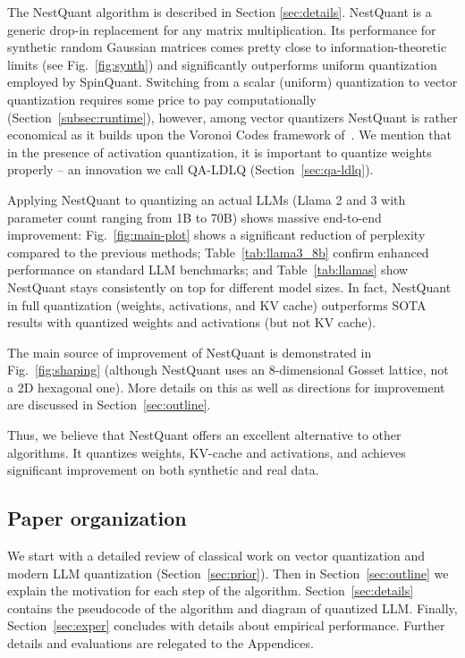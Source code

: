 \documentclass{article}
\theoremstyle{plain}
\theoremstyle{definition}
\theoremstyle{remark}
\begin{document}
The NestQuant algorithm is described in Section \ref{sec:details}. NestQuant is a generic drop-in replacement for any matrix multiplication. Its performance for synthetic random Gaussian matrices comes pretty close to information-theoretic limits (see Fig.~\ref{fig:synth}) and significantly outperforms uniform quantization employed by SpinQuant. Switching from a scalar (uniform) quantization to vector quantization requires some price to pay computationally (Section~\ref{subsec:runtime}), however, among vector quantizers NestQuant is rather economical as it builds upon the Voronoi Codes framework of~\citep{ConwaySloane83}. We mention that in the presence of activation quantization, it is important to quantize weights properly -- an innovation we call QA-LDLQ (Section~\ref{sec:qa-ldlq}).

Applying NestQuant to quantizing an actual LLMs (Llama 2 and 3 with parameter count ranging from 1B to 70B) shows massive end-to-end improvement: Fig.~\ref{fig:main-plot} shows a significant reduction of perplexity compared to the previous methods; Table~\ref{tab:llama3_8b}  confirm enhanced performance on standard LLM benchmarks; and Table~\ref{tab:llamas} show NestQuant stays consistently on top for different model sizes. In fact, NestQuant in full quantization (weights, activations, and KV cache) outperforms SOTA results with quantized  weights and activations (but not KV cache).

The main source of improvement of NestQuant is demonstrated in Fig.~\ref{fig:shaping} (although NestQuant uses an 8-dimensional Gosset lattice, not a 2D hexagonal one). More details on this as well as directions for improvement are discussed in Section~\ref{sec:outline}.

Thus, we believe that NestQuant offers an excellent alternative to other algorithms. It quantizes weights, KV-cache and activations, and achieves significant improvement on both synthetic and real data.

\subsection{Paper organization}

We start with a detailed review of classical work on vector quantization and modern LLM quantization (Section~\ref{sec:prior}). Then in Section~\ref{sec:outline} we explain the motivation for each step of the algorithm. Section~\ref{sec:details} contains the pseudocode of the algorithm and diagram of quantized LLM. Finally, Section~\ref{sec:exper} concludes with details about empirical performance. Further details and evaluations are relegated to the Appendices.
\end{document}
